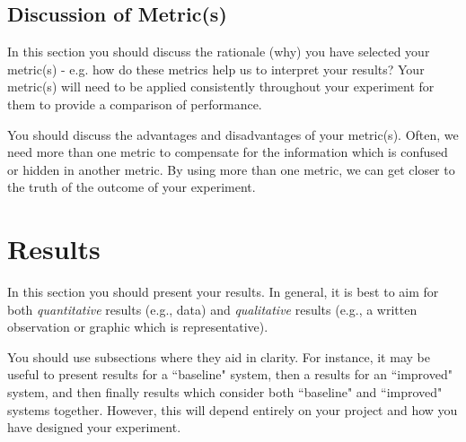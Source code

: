 \documentclass[conference]{IEEEtran}
\begin{document}
\subsection{Discussion of Metric(s)}
 In this section you should discuss the rationale (why) you have selected your metric(s) - e.g. how do these metrics help us to interpret your results?  Your metric(s) will need to be applied consistently throughout your experiment for them to provide a comparison of performance.  
 
 You should discuss the advantages and disadvantages of your metric(s).  Often, we need more than one metric to compensate for the information which is confused or hidden in another metric.  By using more than one metric, we can get closer to the truth of the outcome of your experiment.  

\section{Results}


In this section you should present your results.  In general, it is best to aim for both \emph{quantitative} results (e.g., data) and \emph{qualitative} results (e.g., a written observation or graphic which is representative).  

You should use subsections where they aid in clarity.  For instance, it may be useful to present results for a ``baseline" system, then a results for an ``improved" system, and then finally results which consider both ``baseline" and ``improved" systems together.  However, this will depend entirely on your project and how you have designed your experiment.
\end{document}
